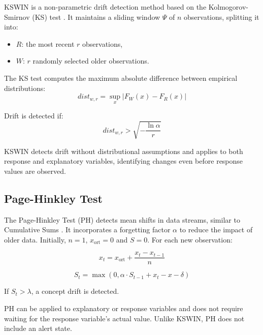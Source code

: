 KSWIN is a non-parametric drift detection method based on the Kolmogorov-Smirnov (KS) test \citep{raab_2020}. It maintains a sliding window \(\Psi\) of \(n\) observations, splitting it into:

\begin{itemize}
    \item $R$: the most recent $r$ observations,
    \item $W$: $r$ randomly selected older observations.
\end{itemize}

The KS test computes the maximum absolute difference between empirical distributions:
\begin{equation}
dist_{w,r} = \sup_x \left| F_W(x) - F_R(x) \right|
\end{equation}

Drift is detected if:
\begin{equation}
dist_{w,r} > \sqrt{-\frac{\ln \alpha}{r}}
\end{equation}

KSWIN detects drift without distributional assumptions and applies to both response and explanatory variables, identifying changes even before response values are observed.

\hypertarget{page-hinkley-test}{%
\subsection{Page-Hinkley Test}\label{page-hinkley-test}}

The Page-Hinkley Test (PH) detects mean shifts in data streams, similar to Cumulative Sums \citep{sebastiano_fernandes_2017}. It incorporates a forgetting factor \(\alpha\) to reduce the impact of older data. Initially, \(n = 1\), \(x_{\text{ort}} = 0\) and \(S = 0\). For each new observation:

\begin{equation}
x_t = x_{\text{ort}} + \frac{x_t - x_{t-1}}{n}
\end{equation}

\begin{equation}
S_t = \max \left(0, \alpha \cdot S_{t-1} + x_t - x - \delta \right)
\end{equation}

If \(S_t > \lambda\), a concept drift is detected.

PH can be applied to explanatory or response variables and does not require waiting for the response variable's actual value. Unlike KSWIN, PH does not include an alert state.

